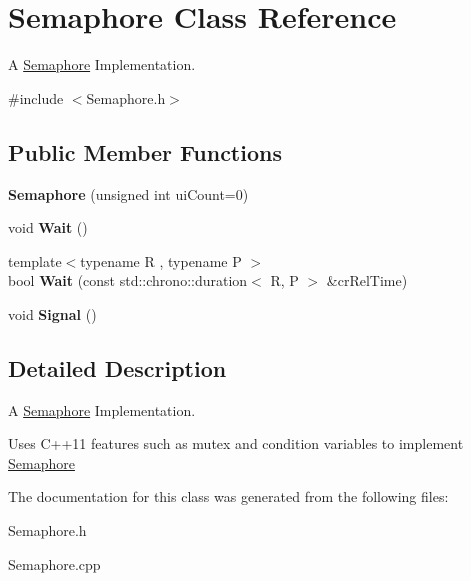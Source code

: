\hypertarget{classSemaphore}{}\section{Semaphore Class Reference}
\label{classSemaphore}


A \hyperlink{classSemaphore}{Semaphore} Implementation.  




{\ttfamily \#include $<$Semaphore.\+h$>$}

\subsection*{Public Member Functions}
\begin{DoxyCompactItemize}
\item 
\mbox{\label{classSemaphore_a0d9290d316636875ca85d1d78950a817}} 
{\bfseries Semaphore} (unsigned int ui\+Count=0)
\item 
\mbox{\label{classSemaphore_a72aabebf026e3a8b1f3e4d0fa8ee1eda}} 
void {\bfseries Wait} ()
\item 
\mbox{\label{classSemaphore_a7f700173ae86ae623684109066e07656}} 
{\footnotesize template$<$typename R , typename P $>$ }\\bool {\bfseries Wait} (const std\+::chrono\+::duration$<$ R, P $>$ \&cr\+Rel\+Time)
\item 
\mbox{\label{classSemaphore_a86f92f738b4486439b296d8e235895f2}} 
void {\bfseries Signal} ()
\end{DoxyCompactItemize}


\subsection{Detailed Description}
A \hyperlink{classSemaphore}{Semaphore} Implementation. 

Uses C++11 features such as mutex and condition variables to implement \hyperlink{classSemaphore}{Semaphore} 

The documentation for this class was generated from the following files\+:\begin{DoxyCompactItemize}
\item 
Semaphore.\+h\item 
Semaphore.\+cpp\end{DoxyCompactItemize}

